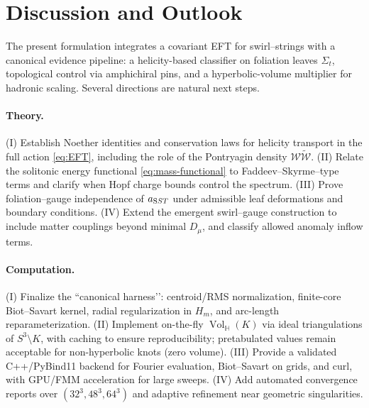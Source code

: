\documentclass[smallextended]{svjour3}       %
\newcommand{\Vol}{\operatorname{Vol}}   %
\begin{document}
    \section{Discussion and Outlook}

    The present formulation integrates a covariant EFT for swirl–strings with a canonical evidence pipeline: a helicity-based classifier on foliation leaves \(\Sigma_t\), topological control via amphichiral pins, and a hyperbolic-volume multiplier for hadronic scaling. Several directions are natural next steps.

    \paragraph{Theory.}
    (I) Establish Noether identities and conservation laws for helicity transport in the full action \eqref{eq:EFT}, including the role of the Pontryagin density \(\mathcal{W}\tilde{\mathcal{W}}\).
    (II) Relate the solitonic energy functional \eqref{eq:mass-functional} to Faddeev–Skyrme–type terms and clarify when Hopf charge bounds control the spectrum.
    (III) Prove foliation–gauge independence of \(a_{\textrm SST}\) under admissible leaf deformations and boundary conditions.
    (IV) Extend the emergent swirl–gauge construction to include matter couplings beyond minimal \(D_\mu\), and classify allowed anomaly inflow terms.

    \paragraph{Computation.}
    (I) Finalize the “canonical harness’’: centroid/RMS normalization, finite-core Biot–Savart kernel, radial regularization in \(H_m\), and arc-length reparameterization.
    (II) Implement on-the-fly \(\Vol_{\!\mathbb{H}}(K)\) via ideal triangulations of \(S^3\!\setminus\!K\), with caching to ensure reproducibility; pretabulated values remain acceptable for non-hyperbolic knots (zero volume).
    (III) Provide a validated C++/PyBind11 backend for Fourier evaluation, Biot–Savart on grids, and curl, with GPU/FMM acceleration for large sweeps.
    (IV) Add automated convergence reports over \((32^3,48^3,64^3)\) and adaptive refinement near geometric singularities.
\end{document}
